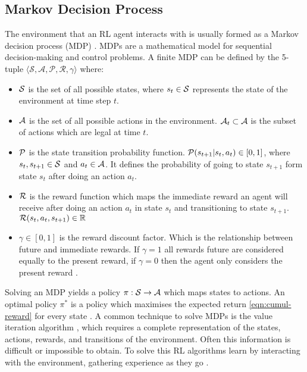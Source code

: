 \documentclass[../main.tex]{subfiles}
\begin{document}
\subsection{Markov Decision Process}
The environment that an RL agent interacts with is usually formed as a Markov decision process (MDP) \cite{littman_markov_1994}. MDPs are a mathematical model for sequential decision-making and control problems. A finite MDP can be defined by the 5-tuple $\langle \mathcal{S, A, P , R, } \gamma \rangle$ where:
\begin{itemize}[nosep]
    \item $\mathcal{S}$ is the set of all possible states, where $s_t \in \mathcal{S}$ represents the state of the environment at time step $t$.
    \item $\mathcal{A}$ is the set of all possible actions in the environment. $\mathcal{A}_t \subset \mathcal{A}$ is the subset of actions which are legal at time $t$.
    \item $\mathcal{P}$ is the state transition probability function. $\mathcal{P}(s_{t+1} \vert s_t, a_t) \in [0, 1]$, where $s_t, s_{t+
    1} \in \mathcal{S}$ and $a_t \in \mathcal{A}$. It defines the probability of going to state $s_{t+1}$ form state $s_t$ after doing an action $a_t$.
    \item $\mathcal{R}$ is the reward function which maps the immediate reward an agent will receive after doing an action $a_t$ in state $s_t$ and transitioning to state $s_{t+1}$. $\mathcal{R}(s_t, a_t, s_{t+1}) \in \mathbb{R}$
    \item $\gamma \in [0, 1]$ is the reward discount factor. Which is the relationship between future and immediate rewards. If $\gamma = 1$ all rewards future are considered equally to the present reward, if $\gamma = 0$ then the agent only considers the present reward \cite{sutton_policy_2000}.
\end{itemize}

Solving an MDP yields a policy $\pi : \mathcal{S} \rightarrow \mathcal{A}$ which maps states to actions. An optimal policy $\pi^*$ is a policy which maximises the expected return \eqref{eqn:cumul-reward} for every state \cite{silver_lectures_2015}. A common technique to solve MDPs is the value iteration algorithm \cite{bellman_markovian_1957}, which requires a complete representation of the states, actions, rewards, and transitions of the environment. Often this information is difficult or impossible to obtain. To solve this RL algorithms learn by interacting with the environment, gathering experience as they go \cite{sutton_reinforcement_2018}. 
\end{document}
